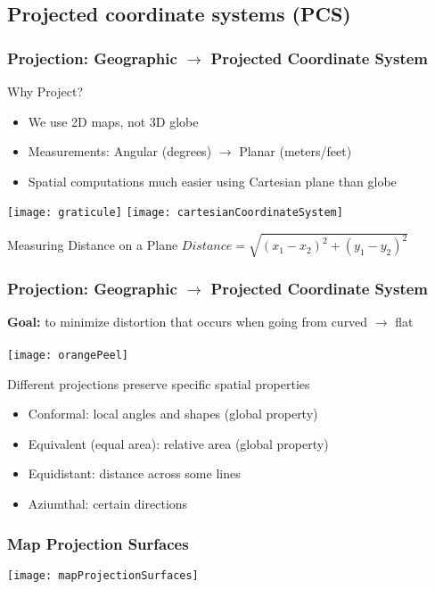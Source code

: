 \documentclass[t]{beamer} %
\begin{document}
\subsection{Projected coordinate systems (PCS)}
\begin{frame}
\frametitle{Projection: Geographic $\rightarrow$ Projected Coordinate System}

Why Project?
\begin{itemize}
\item We use 2D maps, not 3D globe
\item Measurements: Angular (degrees) $\rightarrow$ Planar (meters/feet)
\item Spatial computations much easier using Cartesian plane than globe
\end{itemize}

\texttt{[image: graticule]}\hspace{0.5in}
\texttt{[image: cartesianCoordinateSystem]}

\begin{block}{Measuring Distance on a Plane}
$Distance = \sqrt{(x_1-x_2)^2 + (y_1 -y_2)^2} $
\end{block}
\end{frame}


\begin{frame}
\frametitle{Projection: Geographic $\rightarrow$ Projected Coordinate System}
\textbf{Goal:} to minimize distortion that occurs when going from curved $\rightarrow$ flat \\~\\

\texttt{[image: orangePeel]}

Different projections preserve specific spatial properties
\begin{itemize}
\item Conformal: local angles and shapes (global property) 
\item Equivalent (equal area): relative area (global property)
\item Equidistant: distance across some lines
\item Aziumthal: certain directions
\end{itemize}
\end{frame}


\begin{frame}
\frametitle{Map Projection Surfaces}

\vspace{-0.1in}
\texttt{[image: mapProjectionSurfaces]}
\end{frame}
\end{document}

